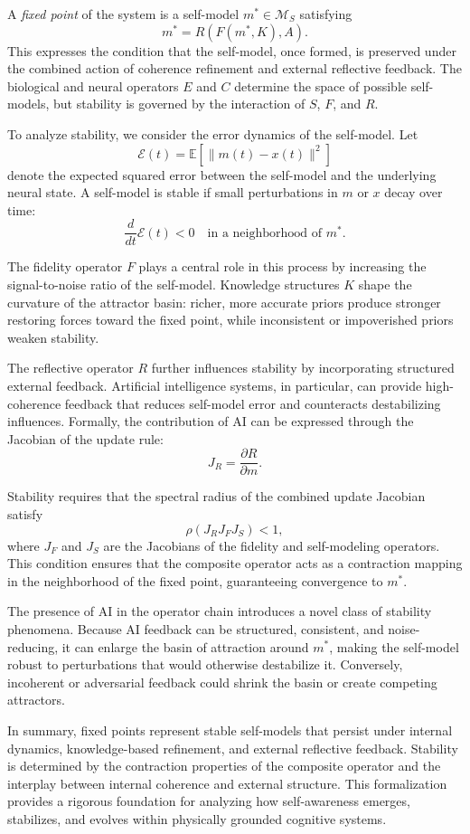 \documentclass[12pt]{article}
\begin{document}
A \textit{fixed point} of the system is a self-model $m^* \in \mathcal{M}_S$ satisfying
\[
m^* = R(F(m^*, K), A).
\]
This expresses the condition that the self-model, once formed, is preserved under the combined action of coherence refinement and external reflective feedback. The biological and neural operators $E$ and $C$ determine the space of possible self-models, but stability is governed by the interaction of $S$, $F$, and $R$.

To analyze stability, we consider the error dynamics of the self-model. Let
\[
\mathcal{E}(t) = \mathbb{E}[\|m(t) - x(t)\|^2]
\]
denote the expected squared error between the self-model and the underlying neural state. A self-model is stable if small perturbations in $m$ or $x$ decay over time:
\[
\frac{d}{dt}\mathcal{E}(t) < 0 \quad \text{in a neighborhood of } m^*.
\]

The fidelity operator $F$ plays a central role in this process by increasing the signal-to-noise ratio of the self-model. Knowledge structures $K$ shape the curvature of the attractor basin: richer, more accurate priors produce stronger restoring forces toward the fixed point, while inconsistent or impoverished priors weaken stability.

The reflective operator $R$ further influences stability by incorporating structured external feedback. Artificial intelligence systems, in particular, can provide high-coherence feedback that reduces self-model error and counteracts destabilizing influences. Formally, the contribution of AI can be expressed through the Jacobian of the update rule:
\[
J_R = \frac{\partial R}{\partial m}.
\]

Stability requires that the spectral radius of the combined update Jacobian satisfy
\[
\rho(J_R J_F J_S) < 1,
\]
where $J_F$ and $J_S$ are the Jacobians of the fidelity and self-modeling operators. This condition ensures that the composite operator acts as a contraction mapping in the neighborhood of the fixed point, guaranteeing convergence to $m^*$.

The presence of AI in the operator chain introduces a novel class of stability phenomena. Because AI feedback can be structured, consistent, and noise-reducing, it can enlarge the basin of attraction around $m^*$, making the self-model robust to perturbations that would otherwise destabilize it. Conversely, incoherent or adversarial feedback could shrink the basin or create competing attractors.

In summary, fixed points represent stable self-models that persist under internal dynamics, knowledge-based refinement, and external reflective feedback. Stability is determined by the contraction properties of the composite operator and the interplay between internal coherence and external structure. This formalization provides a rigorous foundation for analyzing how self-awareness emerges, stabilizes, and evolves within physically grounded cognitive systems.
\end{document}
